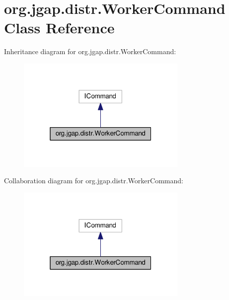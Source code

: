 \hypertarget{classorg_1_1jgap_1_1distr_1_1_worker_command}{\section{org.\-jgap.\-distr.\-Worker\-Command Class Reference}
\label{classorg_1_1jgap_1_1distr_1_1_worker_command}
}


Inheritance diagram for org.\-jgap.\-distr.\-Worker\-Command\-:
\nopagebreak
\begin{figure}[H]
\begin{center}
\leavevmode
\includegraphics[width=232pt]{classorg_1_1jgap_1_1distr_1_1_worker_command__inherit__graph}
\end{center}
\end{figure}


Collaboration diagram for org.\-jgap.\-distr.\-Worker\-Command\-:
\nopagebreak
\begin{figure}[H]
\begin{center}
\leavevmode
\includegraphics[width=232pt]{classorg_1_1jgap_1_1distr_1_1_worker_command__coll__graph}
\end{center}
\end{figure}
